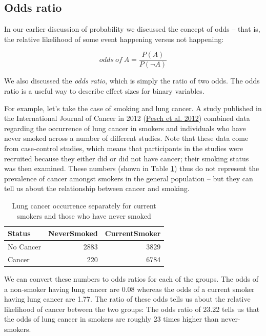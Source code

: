 \documentclass[
  12pt,
]{book}
\begin{document}
\hypertarget{odds-ratio}{%
\subsection{Odds ratio}\label{odds-ratio}}

In our earlier discussion of probability we discussed the concept of odds -- that is, the relative likelihood of some event happening versus not happening:

\[
odds\ of\ A = \frac{P(A)}{P(\neg A)}
\]

We also discussed the \emph{odds ratio}, which is simply the ratio of two odds. The odds ratio is a useful way to describe effect sizes for binary variables.

For example, let's take the case of smoking and lung cancer. A study published in the International Journal of Cancer in 2012 (\protect\hyperlink{ref-pesc:kend:gust:2012}{Pesch et al. 2012}) combined data regarding the occurrence of lung cancer in smokers and individuals who have never smoked across a number of different studies. Note that these data come from case-control studies, which means that participants in the studies were recruited because they either did or did not have cancer; their smoking status was then examined. These numbers (shown in Table \ref{tab:smokingData}) thus do not represent the prevalence of cancer amongst smokers in the general population -- but they can tell us about the relationship between cancer and smoking.

\begin{table}

\caption{\label{tab:smokingData}Lung cancer occurrence separately for current smokers and those who have never smoked}
\centering
\begin{tabular}[t]{l|r|r}
\hline
Status & NeverSmoked & CurrentSmoker\\
\hline
No Cancer & 2883 & 3829\\
\hline
Cancer & 220 & 6784\\
\hline
\end{tabular}
\end{table}

We can convert these numbers to odds ratios for each of the groups. The odds of a non-smoker having lung cancer are 0.08 whereas the odds of a current smoker having lung cancer are 1.77. The ratio of these odds tells us about the relative likelihood of cancer between the two groups: The odds ratio of 23.22 tells us that the odds of lung cancer in smokers are roughly 23 times higher than never-smokers.
\end{document}
